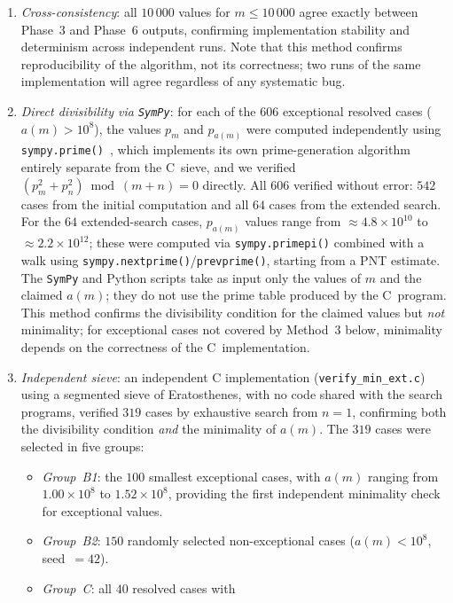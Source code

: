 \documentclass{amsart}
\theoremstyle{definition}
\theoremstyle{remark}
\numberwithin{equation}{section}
\begin{document}
\begin{enumerate}
	\item \emph{Cross-consistency}: all $10\,000$ values for
	$m \leq 10\,000$ agree exactly between Phase~3 and Phase~6 outputs,
	confirming implementation stability and determinism across
	independent runs.
	Note that this method confirms reproducibility of the algorithm,
	not its correctness; two runs of the same implementation will
	agree regardless of any systematic bug.
	\item \emph{Direct divisibility via \texttt{SymPy}}: for each of the
	$606$ exceptional resolved cases ($a(m) > 10^8$), the values $p_m$
	and $p_{a(m)}$ were computed independently using
	\texttt{sympy.prime()}~\cite{SymPy}, which implements its own
	prime-generation algorithm entirely separate from the C~sieve, and
	we verified $(p_m^2 + p_n^2) \bmod (m+n) = 0$ directly.
	All $606$ verified without error: $542$ cases from the initial
	computation and all $64$ cases from the extended search.
	For the $64$ extended-search cases, $p_{a(m)}$ values range from
	$\approx 4.8 \times 10^{10}$ to $\approx 2.2 \times 10^{12}$;
	these were computed via \texttt{sympy.primepi()} combined with a
	walk using \texttt{sympy.nextprime()}/\texttt{prevprime()}, starting
	from a PNT estimate.
	The \texttt{SymPy} and Python scripts take as input only the values
	of $m$ and the claimed $a(m)$; they do not use the prime table
	produced by the C~program.
	This method confirms the divisibility condition for the claimed
	values but \emph{not} minimality; for exceptional cases not covered
	by Method~3 below, minimality depends on the correctness of the
	C~implementation.
	\item \emph{Independent sieve}: an independent C implementation
	(\texttt{verify\_min\_ext.c}) using a segmented sieve of Eratosthenes,
	with no code shared with the search programs, verified $319$ cases
	by exhaustive search from $n = 1$, confirming both the divisibility
	condition \emph{and} the minimality of $a(m)$.
	The $319$ cases were selected in five groups:
	\begin{itemize}
		\item \emph{Group~B1}: the $100$ smallest exceptional cases,
		with $a(m)$ ranging from $1.00 \times 10^8$ to
		$1.52 \times 10^8$, providing the first independent
		minimality check for exceptional values.
		\item \emph{Group~B2}: $150$ randomly selected non-exceptional
		cases ($a(m) < 10^8$, seed~$= 42$).
		\item \emph{Group~C}: all $40$ resolved cases with

\end{itemize}
\end{enumerate}
\end{document}
